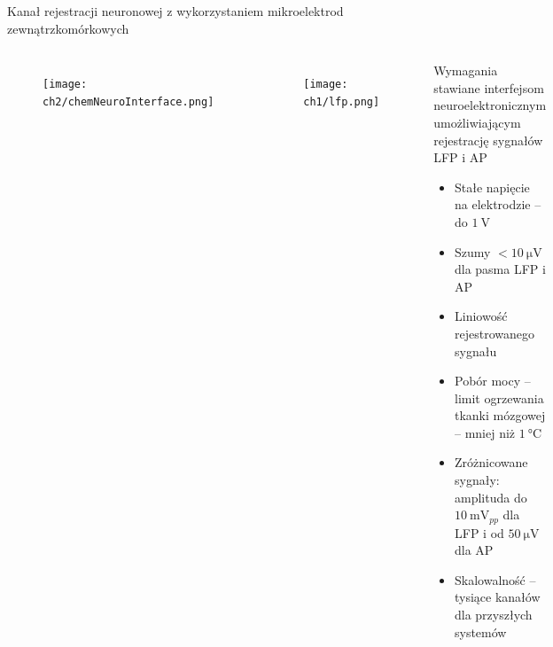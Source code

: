 \begin{frame}{Kanał rejestracji neuronowej z wykorzystaniem mikroelektrod zewnątrzkomórkowych}
\vspace{-1em}
    \begin{columns}
        \begin{figure}[H]
            \centering
            \texttt{[image: ch2/chemNeuroInterface.png]} 

        \end{figure}
        \begin{figure}[H]
            \centering
            \texttt{[image: ch1/lfp.png]} 

          \end{figure}

        \begin{block}{Wymagania stawiane interfejsom neuroelektronicznym umożliwiającym rejestrację sygnałów LFP i AP}
            \begin{itemize}
                \item Stałe napięcie na  elektrodzie -- do $\SI{1}{\volt}$ 
                \item Szumy $<\SI{10}{\micro\volt}$ dla pasma LFP i AP
                \item Liniowość rejestrowanego sygnału
                \item Pobór mocy -- limit ogrzewania tkanki mózgowej --  mniej niż  $\SI{1}{\degreeCelsius}$ 
                \item Zróżnicowane sygnały: amplituda do $\SI{10}{\milli\volt_{pp}}$ dla LFP i od  $\SI{50}{\micro\volt}$ dla AP
                \item Skalowalność -- tysiące kanałów dla przyszłych systemów
            \end{itemize}
        \end{block}
 
    \end{columns}
\end{frame}



